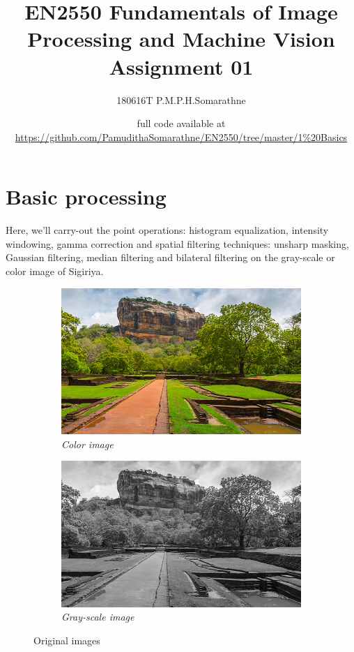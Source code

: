 \documentclass[11pt, a4paper]{article}
\title{{\Large \textbf{EN2550 Fundamentals of Image Processing and Machine Vision\\Assignment 01}}}
\author{{\large 180616T P.M.P.H.Somarathne}}
\date{full code available at \url{https://github.com/PamudithaSomarathne/EN2550/tree/master/1\%20Basics}}
\begin{document}
\maketitle

\section{Basic processing}
\begin{minipage}{.34\textwidth}
Here, we'll carry-out the point operations: histogram equalization, intensity windowing, gamma correction and spatial filtering techniques: unsharp masking, Gaussian filtering, median filtering and bilateral filtering on the gray-scale or color image of Sigiriya.
\end{minipage}
\hfill
\begin{minipage}{.64\textwidth}
\begin{figure}[H]
	\centering
	\begin{subfigure}[b]{0.49\textwidth}
		\centering
		\includegraphics[width=\textwidth]{./a01images/sigiriya.jpg}
		\caption{{\small \textit{Color image}}}
		\label{fig:Color Image}
	\end{subfigure}
	\hfill
	\begin{subfigure}[b]{0.49\textwidth}
		\centering
		\includegraphics[width=\textwidth]{./Outputs/sigiriya_gray.png}
		\caption{{\small \textit{Gray-scale image}}}
		\label{fig:BW Image}
	\end{subfigure}
	\caption{Original images}
\end{figure}
\end{minipage}
\end{document}
